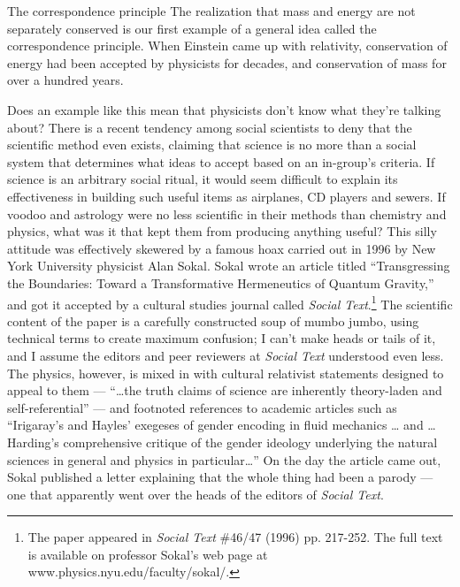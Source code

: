 \begin{envsubsection}{The correspondence principle}
The realization that mass and energy are not separately conserved is our first example
of a general idea called the correspondence principle. When Einstein came up with
relativity, conservation of energy had been accepted by physicists for decades, and
conservation of mass for
over a hundred years.

Does an example like this mean that physicists don't know what they're talking about?
There is a recent tendency among social scientists to 
deny that the scientific method even exists, claiming that
science is no more than a social system that
determines what ideas to accept based on an in-group's
criteria. If science is an
arbitrary social ritual, it would seem difficult to explain
its effectiveness in building such useful items as
airplanes, CD players and sewers. If voodoo
and astrology were no less scientific in
their methods than chemistry and physics, what was it that
kept them from producing anything useful?
This silly attitude was effectively skewered by a famous hoax
carried out in 1996 by New York University physicist Alan Sokal. Sokal wrote
an article titled ``Transgressing the Boundaries: Toward a Transformative 
Hermeneutics of Quantum Gravity,'' and got it accepted by a cultural studies
journal called \emph{Social Text}.\footnote{The paper
appeared in \emph{Social Text} \#46/47 (1996) pp. 217-252. The full text
is available on professor Sokal's web page at www.physics.nyu.edu/faculty/sokal/.}
The scientific content of the paper is a carefully constructed soup of
mumbo jumbo, using technical terms to create maximum confusion; I can't make
heads or tails of it, and I assume the editors and peer reviewers at
\emph{Social Text} understood even less. The physics, however, is mixed
in with cultural relativist statements designed to appeal to them ---
``\ldots the truth claims of science are inherently theory-laden and self-referential'' ---
and footnoted references to academic articles such as 
``Irigaray's and Hayles' exegeses of gender encoding in fluid mechanics \ldots
and \ldots Harding's comprehensive critique of the gender ideology underlying
the natural sciences in general and physics in particular\ldots''
On the day the article came out, Sokal published a letter explaining that
the whole thing had been a parody --- one that apparently went over the heads
of the editors of \emph{Social Text}.


\end{envsubsection}
